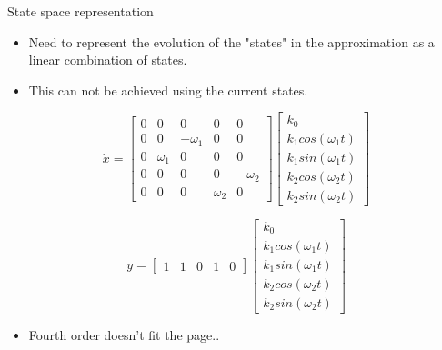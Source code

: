 \begin{frame}{State space representation}
	\begin{itemize}
		\item Need to represent the evolution of the "states" in the approximation as a linear combination of states.
		\item This can not be achieved using the current states.   
	\end{itemize}
	
\begin{equation} \label{eq:consump_A}
	\dot{x} = 
	\begin{bmatrix}
		0 & 0 & 0 & 0 & 0 \\
		0 & 0 & -\omega_1 & 0 & 0 \\
		0 & \omega_1 & 0 & 0 & 0 \\
		0 & 0 & 0 & 0 & -\omega_2 \\
		0 & 0 & 0 & \omega_2 & 0 
	\end{bmatrix}
	\begin{bmatrix}
		k_0 \\
		k_1 cos(\omega_1 t) \\
		k_1 sin(\omega_1 t) \\
		k_2 cos(\omega_2 t) \\
		k_2 sin(\omega_2 t) 
	\end{bmatrix}
\end{equation}

\begin{equation}
	y = \begin{bmatrix} 1 & 1 & 0 & 1 & 0 \end{bmatrix} 
	\begin{bmatrix}
		k_0 \\
		k_1 cos(\omega_1 t) \\
		k_1 sin(\omega_1 t) \\
		k_2 cos(\omega_2 t) \\
		k_2 sin(\omega_2 t) 
	\end{bmatrix}
\end{equation}

	\begin{itemize}
	\item Fourth order doesn't fit the page..
\end{itemize}
\end{frame}

